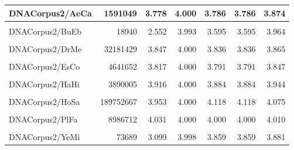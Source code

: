 \documentclass[12pt,twoside]{reedthesis}
\begin{document}
\begin{table}[!h]
{\begin{tabular}[t]{l|r|r|r|r|r|r}
\hline
DNACorpus2/AeCa & 1591049 & 3.778 & 4.000 & 3.786 & 3.786 & 3.874\\
\hline
\cellcolor{gray!6}{DNACorpus2/AgPh} & \cellcolor{gray!6}{43970} & \cellcolor{gray!6}{2.807} & \cellcolor{gray!6}{3.997} & \cellcolor{gray!6}{3.653} & \cellcolor{gray!6}{3.653} & \cellcolor{gray!6}{3.957}\\
\hline
DNACorpus2/BuEb & 18940 & 2.552 & 3.993 & 3.595 & 3.595 & 3.964\\
\hline
\cellcolor{gray!6}{DNACorpus2/DaRe} & \cellcolor{gray!6}{62565020} & \cellcolor{gray!6}{3.928} & \cellcolor{gray!6}{4.000} & \cellcolor{gray!6}{4.013} & \cellcolor{gray!6}{4.013} & \cellcolor{gray!6}{4.035}\\
\hline
DNACorpus2/DrMe & 32181429 & 3.847 & 4.000 & 3.836 & 3.836 & 3.865\\
\hline
\cellcolor{gray!6}{DNACorpus2/EnIn} & \cellcolor{gray!6}{26403087} & \cellcolor{gray!6}{3.918} & \cellcolor{gray!6}{4.000} & \cellcolor{gray!6}{3.893} & \cellcolor{gray!6}{3.893} & \cellcolor{gray!6}{3.928}\\
\hline
DNACorpus2/EsCo & 4641652 & 3.817 & 4.000 & 3.791 & 3.791 & 3.847\\
\hline
\cellcolor{gray!6}{DNACorpus2/GaGa} & \cellcolor{gray!6}{148532294} & \cellcolor{gray!6}{3.776} & \cellcolor{gray!6}{4.000} & \cellcolor{gray!6}{3.943} & \cellcolor{gray!6}{3.943} & \cellcolor{gray!6}{3.897}\\
\hline
DNACorpus2/HaHi & 3890005 & 3.916 & 4.000 & 3.884 & 3.884 & 3.944\\
\hline
\cellcolor{gray!6}{DNACorpus2/HePy} & \cellcolor{gray!6}{1667825} & \cellcolor{gray!6}{3.884} & \cellcolor{gray!6}{4.000} & \cellcolor{gray!6}{3.894} & \cellcolor{gray!6}{3.894} & \cellcolor{gray!6}{3.942}\\
\hline
DNACorpus2/HoSa & 189752667 & 3.953 & 4.000 & 4.118 & 4.118 & 4.075\\
\hline
\cellcolor{gray!6}{DNACorpus2/OrSa} & \cellcolor{gray!6}{43262523} & \cellcolor{gray!6}{3.843} & \cellcolor{gray!6}{4.000} & \cellcolor{gray!6}{3.858} & \cellcolor{gray!6}{3.858} & \cellcolor{gray!6}{3.908}\\
\hline
DNACorpus2/PlFa & 8986712 & 4.031 & 4.000 & 4.000 & 4.000 & 4.010\\
\hline
\cellcolor{gray!6}{DNACorpus2/ScPo} & \cellcolor{gray!6}{10652155} & \cellcolor{gray!6}{3.847} & \cellcolor{gray!6}{4.000} & \cellcolor{gray!6}{3.813} & \cellcolor{gray!6}{3.813} & \cellcolor{gray!6}{3.851}\\
\hline
DNACorpus2/YeMi & 73689 & 3.099 & 3.998 & 3.859 & 3.859 & 3.881\\
\hline
\end{tabular}}
\end{table}
\end{document}
